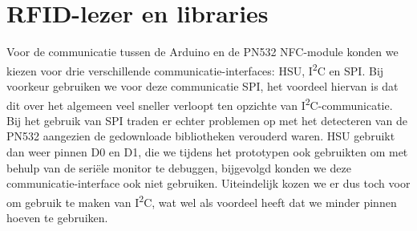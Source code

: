\section{RFID-lezer en libraries}
Voor de communicatie tussen de Arduino en de PN532 NFC-module konden we kiezen voor drie verschillende communicatie-interfaces: HSU, I\textsuperscript{2}C en SPI.
Bij voorkeur gebruiken we voor deze communicatie SPI, het voordeel hiervan is dat dit over het algemeen veel sneller verloopt ten opzichte van I\textsuperscript{2}C-communicatie. Bij het gebruik van SPI traden er echter problemen op met het detecteren van de PN532 aangezien de gedownloade bibliotheken verouderd waren.
HSU gebruikt dan weer pinnen D0 en D1, die we tijdens het prototypen ook gebruikten om met behulp van de seri\"ele monitor te debuggen, bijgevolgd konden we deze communicatie-interface ook niet gebruiken. Uiteindelijk kozen we er dus toch voor om gebruik te maken van I\textsuperscript{2}C, wat wel als voordeel heeft dat we minder pinnen hoeven te gebruiken.